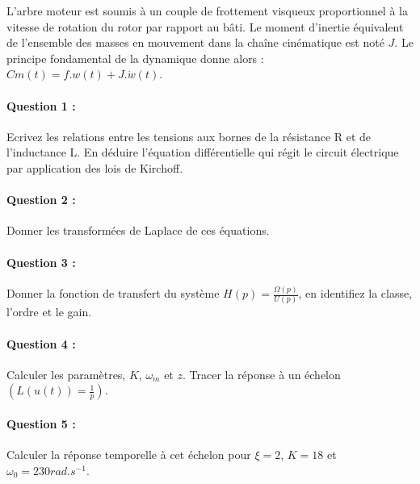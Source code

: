 L'arbre moteur est soumis à un couple de frottement visqueux proportionnel à la vitesse de rotation du rotor par rapport au bâti. Le moment d'inertie équivalent de l'ensemble des masses en mouvement dans la chaîne cinématique est noté $J$. Le principe fondamental de la dynamique donne alors : $Cm(t)=f.w(t)+J.\dot{w}(t)$.

 
\paragraph{Question 1 :} Ecrivez les relations entre les tensions aux bornes de la résistance R et de l'inductance L. En déduire l'équation différentielle qui régit le circuit électrique par application des lois de Kirchoff.

\paragraph{Question 2 :} Donner les transformées de Laplace de ces équations. 

\paragraph{Question 3 :} Donner la fonction de transfert du système $H(p)=\frac{\Omega(p)}{U(p)}$, en identifiez la classe, l'ordre et le gain.

\paragraph{Question 4 :} Calculer les paramètres, $K$, $\omega_m$ et $z$. Tracer la réponse à un échelon $(L(u(t))=\frac{1}{p})$.

\paragraph{Question 5 :} Calculer la réponse temporelle à cet échelon pour $\xi=2$, $K=18$ et $\omega_0=230rad.s^{-1}$.

